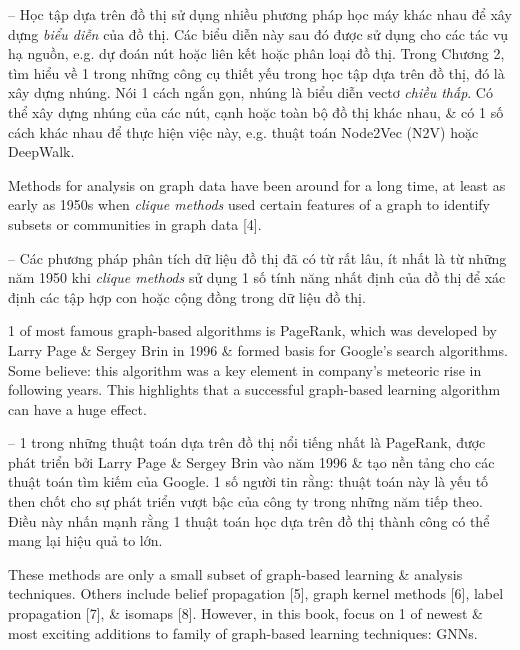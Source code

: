 \documentclass{article}
\begin{document}
\begin{itemize}
\begin{itemize}
\begin{itemize}
            -- Học tập dựa trên đồ thị sử dụng nhiều phương pháp học máy khác nhau để xây dựng {\it biểu diễn} của đồ thị. Các biểu diễn này sau đó được sử dụng cho các tác vụ hạ nguồn, e.g. dự đoán nút hoặc liên kết hoặc phân loại đồ thị. Trong Chương 2, tìm hiểu về 1 trong những công cụ thiết yếu trong học tập dựa trên đồ thị, đó là xây dựng nhúng. Nói 1 cách ngắn gọn, nhúng là biểu diễn vectơ {\it chiều thấp}. Có thể xây dựng nhúng của các nút, cạnh hoặc toàn bộ đồ thị khác nhau, \& có 1 số cách khác nhau để thực hiện việc này, e.g. thuật toán Node2Vec (N2V) hoặc DeepWalk.

            Methods for analysis on graph data have been around for a long time, at least as early as 1950s when {\it clique methods} used certain features of a graph to identify subsets or communities in graph data [4].

            -- Các phương pháp phân tích dữ liệu đồ thị đã có từ rất lâu, ít nhất là từ những năm 1950 khi {\it clique methods} sử dụng 1 số tính năng nhất định của đồ thị để xác định các tập hợp con hoặc cộng đồng trong dữ liệu đồ thị.

            1 of most famous graph-based algorithms is PageRank, which was developed by {\sc Larry Page \& Sergey Brin} in 1996 \& formed basis for Google's search algorithms. Some believe: this algorithm was a key element in company's meteoric rise in following years. This highlights that a successful graph-based learning algorithm can have a huge effect.

            -- 1 trong những thuật toán dựa trên đồ thị nổi tiếng nhất là PageRank, được phát triển bởi Larry Page \& Sergey Brin vào năm 1996 \& tạo nền tảng cho các thuật toán tìm kiếm của Google. 1 số người tin rằng: thuật toán này là yếu tố then chốt cho sự phát triển vượt bậc của công ty trong những năm tiếp theo. Điều này nhấn mạnh rằng 1 thuật toán học dựa trên đồ thị thành công có thể mang lại hiệu quả to lớn.

            These methods are only a small subset of graph-based learning \& analysis techniques. Others include belief propagation [5], graph kernel methods [6], label propagation [7], \& isomaps [8]. However, in this book, focus on 1 of newest \& most exciting additions to family of graph-based learning techniques: GNNs.


\end{itemize}
\end{itemize}
\end{itemize}
\end{document}
